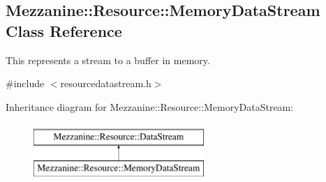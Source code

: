 \hypertarget{classMezzanine_1_1Resource_1_1MemoryDataStream}{
\subsection{Mezzanine::Resource::MemoryDataStream Class Reference}
\label{classMezzanine_1_1Resource_1_1MemoryDataStream}
}


This represents a stream to a buffer in memory.  




{\ttfamily \#include $<$resourcedatastream.h$>$}

Inheritance diagram for Mezzanine::Resource::MemoryDataStream:\begin{figure}[H]
\begin{center}
\leavevmode
\includegraphics[height=2.000000cm]{classMezzanine_1_1Resource_1_1MemoryDataStream}
\end{center}
\end{figure}
